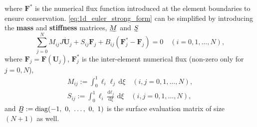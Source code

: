\documentclass[a4paper,11pt,oneside]{article}
\newcommand{\newword}[1]{\textbf{#1}} %
\newcommand{\vect}[1]{\ensuremath{\boldsymbol{\mathbf{#1}}}} %
\newcommand{\der}[2]{\frac{\sdd #1}{\sdd #2}}
\newcommand{\sdi}{\ensuremath{\,\text{d}}} %
\newcommand{\sdd}{\ensuremath{\text{d}}} %
\DeclareMathOperator{\diag}{diag} %
\newcommand{\defeq}{\ensuremath{:=}} %
\newcommand{\linalgmat}[1]{\ensuremath{\undertilde{#1}}} %
\newcommand{\eulerref}[1]{\ensuremath{#1}} %
\begin{document}
where $\vect{\eulerref{F}}^*$ is the numerical flux function introduced at the element boundaries to ensure conservation. \cref{eq:1d_euler_strong_form} can be simplified by introducing the \newword{mass} and \newword{stiffness} matrices, $\linalgmat{M}$ and $\linalgmat{S}$
\begin{equation}
	\sum_{j=0}^{N} M_{ij} J \dot{\vect{\eulerref{U}}}_j + S_{ij} \vect{\eulerref{F}}_j + B_{ij} \left( \vect{\eulerref{F}}^*_j - \vect{\eulerref{F}}_j \right) = 0 \quad (i=0,1,\ldots,N),
	\label{eq:1d_euler_tensor_form1}
\end{equation}
where $\vect{\eulerref{F}}_j=\eulerref{\vect{F}}(\vect{\eulerref{U}}_j)$, $\vect{\eulerref{F}}^*_j$ is the inter-element numerical flux (non-zero only for $j=0,N$),
\begin{gather*}
	M_{ij} \defeq \int_{0}^{1} \ell_i \ell_j \sdi \xi \quad (i,j=0,1,\ldots,N),\\
	S_{ij} \defeq \int_{0}^{1} \ell_i \der{\ell_j}{\xi} \sdi \xi \quad (i,j=0,1,\ldots,N),
\end{gather*}
and $\linalgmat{B} \defeq \diag (-1,\ 0,\ \ldots,\ 0,\ 1)$ is the surface evaluation matrix of size $(N+1)$ as well.
\end{document}
